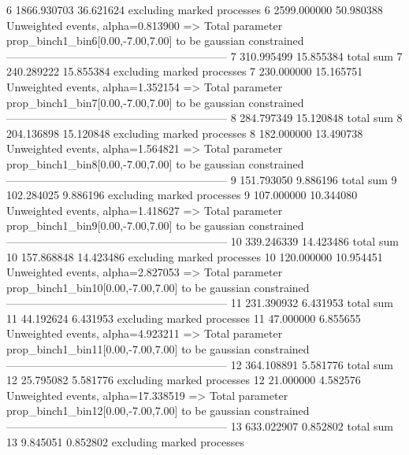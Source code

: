 6          1866.930703     36.621624       excluding marked processes    
6          2599.000000     50.980388       Unweighted events, alpha=0.813900
  => Total parameter prop_binch1_bin6[0.00,-7.00,7.00] to be gaussian constrained
------------------------------------------------------------
7          310.995499      15.855384       total sum                     
7          240.289222      15.855384       excluding marked processes    
7          230.000000      15.165751       Unweighted events, alpha=1.352154
  => Total parameter prop_binch1_bin7[0.00,-7.00,7.00] to be gaussian constrained
------------------------------------------------------------
8          284.797349      15.120848       total sum                     
8          204.136898      15.120848       excluding marked processes    
8          182.000000      13.490738       Unweighted events, alpha=1.564821
  => Total parameter prop_binch1_bin8[0.00,-7.00,7.00] to be gaussian constrained
------------------------------------------------------------
9          151.793050      9.886196        total sum                     
9          102.284025      9.886196        excluding marked processes    
9          107.000000      10.344080       Unweighted events, alpha=1.418627
  => Total parameter prop_binch1_bin9[0.00,-7.00,7.00] to be gaussian constrained
------------------------------------------------------------
10         339.246339      14.423486       total sum                     
10         157.868848      14.423486       excluding marked processes    
10         120.000000      10.954451       Unweighted events, alpha=2.827053
  => Total parameter prop_binch1_bin10[0.00,-7.00,7.00] to be gaussian constrained
------------------------------------------------------------
11         231.390932      6.431953        total sum                     
11         44.192624       6.431953        excluding marked processes    
11         47.000000       6.855655        Unweighted events, alpha=4.923211
  => Total parameter prop_binch1_bin11[0.00,-7.00,7.00] to be gaussian constrained
------------------------------------------------------------
12         364.108891      5.581776        total sum                     
12         25.795082       5.581776        excluding marked processes    
12         21.000000       4.582576        Unweighted events, alpha=17.338519
  => Total parameter prop_binch1_bin12[0.00,-7.00,7.00] to be gaussian constrained
------------------------------------------------------------
13         633.022907      0.852802        total sum                     
13         9.845051        0.852802        excluding marked processes    
